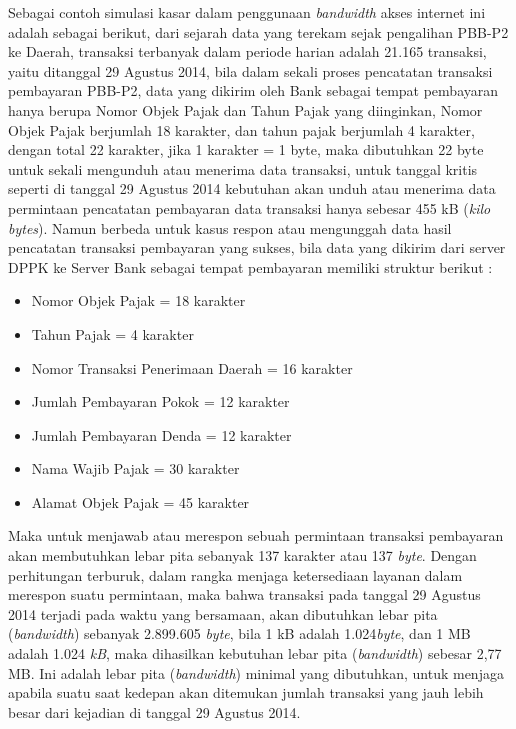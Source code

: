 \documentclass[pdftex,12pt, oneside]{article}
\begin{document}
\begin{enumerate}
Sebagai contoh simulasi kasar dalam penggunaan \textit{bandwidth} akses internet ini adalah sebagai berikut, dari sejarah data yang terekam sejak pengalihan PBB-P2 ke Daerah, transaksi terbanyak dalam periode harian adalah 21.165 transaksi, yaitu ditanggal 29 Agustus 2014, bila dalam sekali proses pencatatan transaksi pembayaran PBB-P2, data yang dikirim oleh Bank sebagai tempat pembayaran hanya berupa Nomor Objek Pajak dan Tahun Pajak yang diinginkan, Nomor Objek Pajak berjumlah 18 karakter, dan tahun pajak berjumlah 4 karakter, dengan total 22 karakter, jika 1 karakter = 1 byte, maka dibutuhkan 22 byte untuk sekali mengunduh atau menerima data transaksi, untuk tanggal kritis seperti di tanggal 29 Agustus 2014 kebutuhan akan unduh atau menerima data permintaan pencatatan pembayaran data transaksi hanya sebesar 455 kB (\textit{kilo bytes}). Namun berbeda untuk kasus respon atau mengunggah data hasil pencatatan transaksi pembayaran yang sukses, bila data yang dikirim dari server DPPK ke Server Bank sebagai tempat pembayaran memiliki struktur berikut :

\begin{itemize}
  \item Nomor Objek Pajak = 18 karakter
  \item Tahun Pajak = 4 karakter
  \item Nomor Transaksi Penerimaan Daerah = 16 karakter
  \item Jumlah Pembayaran Pokok = 12 karakter
  \item Jumlah Pembayaran Denda = 12 karakter
  \item Nama Wajib Pajak = 30 karakter
  \item Alamat Objek Pajak = 45 karakter
\end{itemize}

Maka untuk menjawab atau merespon sebuah permintaan transaksi pembayaran akan membutuhkan lebar pita sebanyak 137 karakter atau 137 \textit{byte}. Dengan perhitungan terburuk, dalam rangka menjaga ketersediaan layanan dalam merespon suatu permintaan, maka bahwa transaksi pada tanggal 29 Agustus 2014 terjadi pada waktu yang bersamaan, akan dibutuhkan lebar pita (\textit{bandwidth}) sebanyak 2.899.605 \textit{byte}, bila 1 kB adalah 1.024\textit{byte}, dan 1 MB adalah 1.024 \textit{kB}, maka dihasilkan kebutuhan lebar pita (\textit{bandwidth}) sebesar 2,77 MB. Ini adalah lebar pita (\textit{bandwidth}) minimal yang dibutuhkan, untuk menjaga apabila suatu saat kedepan akan ditemukan jumlah transaksi yang jauh lebih besar dari kejadian di tanggal 29 Agustus 2014.


\end{enumerate}
\end{document}
